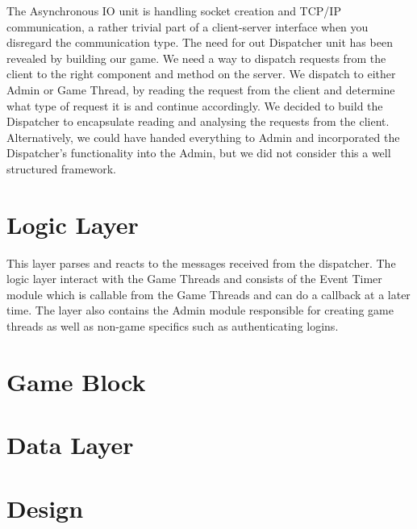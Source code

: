 The Asynchronous IO unit is handling socket creation and TCP/IP communication, a rather trivial part of a client-server interface when you disregard the communication type. The need for out Dispatcher unit has been revealed by building our game. We need a way to dispatch requests from the client to the right component and method on the server. We dispatch to either Admin or Game Thread, by reading the request from the client and determine what type of request it is and continue accordingly. We decided to build the Dispatcher to encapsulate reading and analysing the requests from the client. Alternatively, we could have handed everything to Admin and incorporated the Dispatcher's functionality into the Admin, but we did not consider this a well structured framework.





\section{Logic Layer}
This layer parses and reacts to the messages received from the dispatcher. The logic layer interact with the Game Threads and consists of the Event Timer module which is callable from the Game Threads and can do a callback at a later time. The layer also contains the Admin module responsible for creating game threads as well as non-game specifics such as authenticating logins.






\section{Game Block}


\section{Data Layer}



\section{Design}
